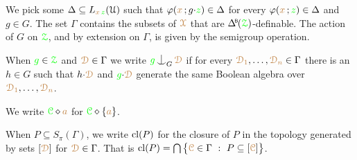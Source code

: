 We pick some $\Delta\subseteq L_{{\color{brown} x}\,{\color{green} z}}(\EuScript U)$ such that $\varphi({\color{brown} x}\,;g{\cdot}{\color{green} z})\in\Delta$ for every $\varphi({\color{brown} x}\,;{\color{green} z})\in\Delta$ and $g\in G$.
The set \emph{$\Gamma$\/} contains the subsets of ${\color{brown}\EuScript X}$ that are $\BDelta(\grZ)$-definable.
The action of $G$ on ${\color{green}\EuScript Z}$, and by extension on $\Gamma$, is given by the semigroup operation.

When ${\color{green} g}\in{\color{green}\EuScript Z}$ and ${\color{brown}\EuScript D}\in\Gamma$ we write ${\gr g}\nonfork_G\mrD$ if for every ${\color{brown}\EuScript D_1},\dots,{\color{brown}\EuScript D_n}\in\Gamma$ there is an $h\in G$ such that $h{\cdot}{\color{brown}\EuScript D}$ and ${\color{green} g}{\cdot}{\color{brown}\EuScript D}$ generate the same Boolean algebra over ${\color{brown}\EuScript D_1},\dots,{\color{brown}\EuScript D_n}$.




We write ${\color{green}\EuScript C}\diamond{\color{brown}a}$ for ${\color{green}\EuScript C}\diamond\{{\color{brown} a}\}$.

When $P\subseteq S_\pi(\Gamma)$, we write \emph{${\rm cl}(P)$\/} for the closure of $P$ in the topology generated by sets $[{\color{brown}\EuScript D}]$ for ${\color{brown}\EuScript D}\in\Gamma$.
That is ${\rm cl}(P) = \bigcap\big\{\mrC\in\Gamma\ :\ P\subseteq[\mrC]\big\}$.


  

